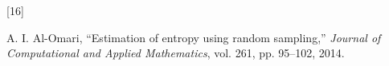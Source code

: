 \documentclass[
  lettersize  journal,
]{IEEEtran}%
\newlength{\cslhangindent}
\newlength{\csllabelwidth}
\newenvironment{CSLReferences}[2] %
 {\begin{list}{}{%
  \setlength{\itemindent}{0pt}
  \setlength{\leftmargin}{0pt}
  \setlength{\parsep}{0pt}
  \ifodd #1
   \setlength{\leftmargin}{\cslhangindent}
   \setlength{\itemindent}{-1\cslhangindent}
  \fi
  \setlength{\itemsep}{#2\baselineskip}}}
 {\end{list}}
\newcommand{\CSLLeftMargin}[1]{\parbox[t]{\csllabelwidth}{\strut#1\strut}}
\newcommand{\CSLRightInline}[1]{\parbox[t]{\linewidth - \csllabelwidth}{\strut#1\strut}}
\providecommand{\DIFaddbegin}{} %
\providecommand{\DIFaddend}{} %
\providecommand{\DIFdelbegin}{} %
\providecommand{\DIFdelend}{} %
\newcommand{\DIFscaledelfig}{0.5}
\newlength{\DIFdelgraphicswidth} %
\newlength{\DIFdelgraphicsheight} %
\newcommand{\DIFaddincludegraphics}[2][]{{\color{blue}\fbox{\DIFOincludegraphics[#1]{#2}}}} %
\newcommand{\DIFdelincludegraphics}[2][]{%
\sbox{\DIFdelgraphicsbox}{\DIFOincludegraphics[#1]{#2}}%
\settoboxwidth{\DIFdelgraphicswidth}{\DIFdelgraphicsbox} %
\settoboxtotalheight{\DIFdelgraphicsheight}{\DIFdelgraphicsbox} %
\scalebox{\DIFscaledelfig}{%
\parbox[b]{\DIFdelgraphicswidth}{\usebox{\DIFdelgraphicsbox}\\[-\baselineskip] \rule{\DIFdelgraphicswidth}{0em}}\llap{\resizebox{\DIFdelgraphicswidth}{\DIFdelgraphicsheight}{%
\setlength{\unitlength}{\DIFdelgraphicswidth}%
\begin{picture}(1,1)%
\thicklines\linethickness{2pt} %
{\color[rgb]{1,0,0}\put(0,0){\framebox(1,1){}}}%
{\color[rgb]{1,0,0}\put(0,0){\line( 1,1){1}}}%
{\color[rgb]{1,0,0}\put(0,1){\line(1,-1){1}}}%
\end{picture}%
}\hspace*{3pt}}} %
} %
\DeclareRobustCommand{\DIFaddbegin}{\DIFOaddbegin \let\includegraphics\DIFaddincludegraphics} %
\DeclareRobustCommand{\DIFaddend}{\DIFOaddend \let\includegraphics\DIFOincludegraphics} %
\DeclareRobustCommand{\DIFdelbegin}{\DIFOdelbegin \let\includegraphics\DIFdelincludegraphics} %
\DeclareRobustCommand{\DIFdelend}{\DIFOaddend \let\includegraphics\DIFOincludegraphics} %
\begin{document}
\begin{CSLReferences}{0}{0}
\DIFdelbegin {}



\DIFdelend {}
\DIFdelbegin %
\DIFdelend \DIFaddbegin \CSLLeftMargin{{[}16{]} }\DIFaddend %
\CSLRightInline{A. I. Al-Omari, {``Estimation of entropy using random
sampling,''} \emph{Journal of Computational and Applied Mathematics},
vol. 261, pp. 95--102, 2014. }
\DIFdelbegin %


\DIFdelend 

\end{CSLReferences}
\end{document}
